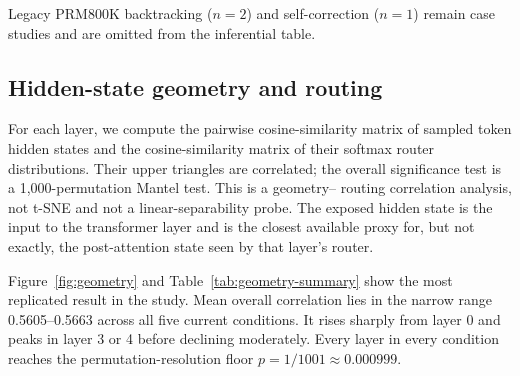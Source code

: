 \documentclass[manuscript,screen,review]{jair}
\newcommand{\modelmetrics}[2]{\textit{Model(s):} #1. \textit{Metrics:} #2.}
\begin{document}
\begin{table}[t]
\centering
\caption{Legacy corrected PRM800K matched-control effects at the event.
Intervals are trace-level 95\% bootstrap intervals with 1,000 replicates.
\modelmetrics{\texttt{allenai/OLMoE-1B-7B-0924-Instruct}, legacy PRM800K
run}{eligible-trace count and mean matched-control differences in routing
entropy, top-$k$ switch rate, top-$k$ Jaccard overlap, and router margin, each
with a 95\% confidence interval}}
\label{tab:prm-routing}
\end{table}

Legacy PRM800K backtracking ($n=2$) and self-correction ($n=1$) remain case
studies and are omitted from the inferential table.

\subsection{Hidden-state geometry and routing}

For each layer, we compute the pairwise cosine-similarity matrix of sampled
token hidden states and the cosine-similarity matrix of their softmax router
distributions.  Their upper triangles are correlated; the overall
significance test is a 1,000-permutation Mantel test.  This is a geometry--
routing correlation analysis, not t-SNE and not a linear-separability probe.
The exposed hidden state is the input to the transformer layer and is the
closest available proxy for, but not exactly, the post-attention state seen by
that layer's router.

Figure~\ref{fig:geometry} and Table~\ref{tab:geometry-summary} show the most
replicated result in the study.  Mean overall correlation lies in the narrow
range 0.5605--0.5663 across all five current conditions.  It rises sharply
from layer 0 and peaks in layer 3 or 4 before declining moderately.  Every
layer in every condition reaches the permutation-resolution floor
$p=1/1001\approx0.000999$.
\end{document}
